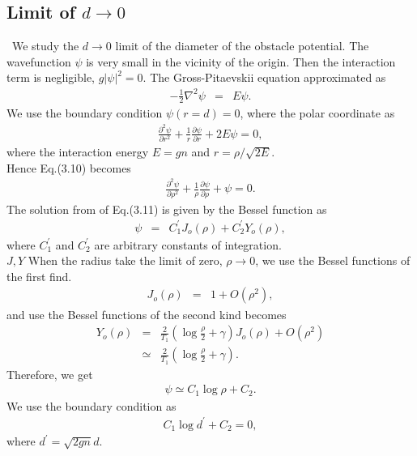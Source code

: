 \documentclass[12pt,a4paper]{report}
\begin{document}
\subsection{Limit of $d \rightarrow 0$}
\ We study the $d \rightarrow 0$ limit of the diameter of the obstacle potential.
The wavefunction $\psi$ is very small in the vicinity of the origin.
Then the interaction term is negligible, $g|\psi|^2 = 0$. The Gross-Pitaevskii equation approximated as
\begin{eqnarray}
-\frac{1}{2} \nabla^2 \psi & = & E \psi.
\end{eqnarray}
We use the boundary condition $\psi(r=d)=0$, where the polar coordinate as
\begin{eqnarray}
\frac{\partial^2 \psi}{\partial r^2} + \frac{1}{r}\frac{\partial \psi}{\partial r} + 2E \psi = 0,
\end{eqnarray}
where the interaction energy $E = gn$ and $r = \rho/\sqrt{2E}$.
\\
Hence Eq.(3.10) becomes
\begin{eqnarray}
\frac{\partial^2 \psi}{\partial \rho^2} + \frac{1}{\rho} \frac{\partial \psi}{\partial \rho} + \psi = 0.
\end{eqnarray}
The solution from of Eq.(3.11) is given by the Bessel function as
\begin{eqnarray}
\psi & = & C_1^\prime J_o (\rho) + C_2^\prime Y_o (\rho),
\end{eqnarray}
where $C_1^\prime$ and $C_2^\prime$ are arbitrary constants of integration.
\\
$J, Y$
When the radius take the limit of zero, $\rho \rightarrow 0$,
we use the Bessel functions of the first find.
\begin{eqnarray}
J_o (\rho) & = & 1 + O(\rho^2),
\end{eqnarray}
and use the Bessel functions of the second kind becomes
\begin{eqnarray}
Y_o (\rho) & = & \frac{2}{T_1} \left( \log \frac{\rho}{2} + \gamma \right) J_o (\rho) + O(\rho^2)
\\
& \simeq & \frac{2}{T_1} \left( \log \frac{\rho}{2} + \gamma \right).
\end{eqnarray}
Therefore, we get
\begin{eqnarray}
\psi \simeq C_1 \log \rho + C_2.
\end{eqnarray}
We use the boundary condition as
\begin{eqnarray}
C_1 \log d^\prime + C_2 = 0,
\end{eqnarray}
where $d^\prime = \sqrt{2gn} d$.
\end{document}
